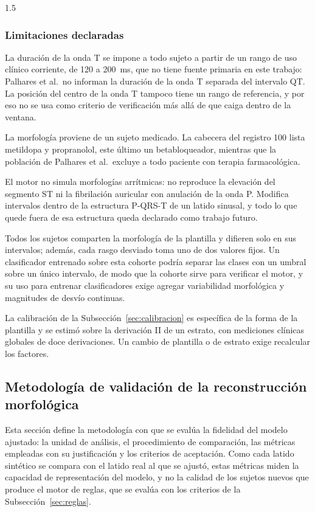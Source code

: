 \begin{spacing}{1.5}
\subsubsection{Limitaciones declaradas}

La duración de la onda T se impone a todo sujeto a partir de un rango de uso clínico corriente, de 120 a 200~ms, que no tiene fuente primaria en este trabajo: Palhares et al.\ no informan la duración de la onda T separada del intervalo QT. La posición del centro de la onda T tampoco tiene un rango de referencia, y por eso no se usa como criterio de verificación más allá de que caiga dentro de la ventana.

La morfología proviene de un sujeto medicado. La cabecera del registro 100 lista metildopa y propranolol, este último un betabloqueador, mientras que la población de Palhares et al.\ excluye a todo paciente con terapia farmacológica.

El motor no simula morfologías arrítmicas: no reproduce la elevación del segmento ST ni la fibrilación auricular con anulación de la onda P. Modifica intervalos dentro de la estructura P-QRS-T de un latido sinusal, y todo lo que quede fuera de esa estructura queda declarado como trabajo futuro.

Todos los sujetos comparten la morfología de la plantilla y difieren solo en sus intervalos; además, cada rasgo desviado toma uno de dos valores fijos. Un clasificador entrenado sobre esta cohorte podría separar las clases con un umbral sobre un único intervalo, de modo que la cohorte sirve para verificar el motor, y su uso para entrenar clasificadores exige agregar variabilidad morfológica y magnitudes de desvío continuas.

La calibración de la Subsección~\ref{sec:calibracion} es específica de la forma de la plantilla y se estimó sobre la derivación II de un estrato, con mediciones clínicas globales de doce derivaciones. Un cambio de plantilla o de estrato exige recalcular los factores.


\subsection{Metodología de validación de la reconstrucción morfológica}

Esta sección define la metodología con que se evalúa la fidelidad del modelo ajustado: la unidad de análisis, el procedimiento de comparación, las métricas empleadas con su justificación y los criterios de aceptación. Como cada latido sintético se compara con el latido real al que se ajustó, estas métricas miden la capacidad de representación del modelo, y no la calidad de los sujetos nuevos que produce el motor de reglas, que se evalúa con los criterios de la Subsección~\ref{sec:reglas}.


\end{spacing}
